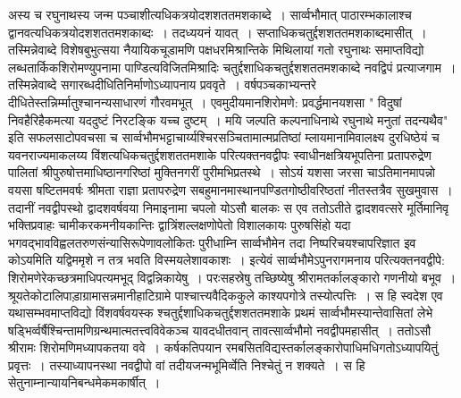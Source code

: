 \documentclass[10pt, openany]{book}
\begin{document}
अस्य च रघुनाथस्य जन्म पञ्चाशीत्यधिकत्रयोदशशततमशकाब्दे~। सार्व्वभौमात् पाठारम्भकालाश्च द्वानवत्यधिकत्रयोदशशततमशकाब्दः~। तदध्ययनं यावत्~।
सप्ताधिकचतुर्द्दशशततमशकाब्दमासीत्~। तस्मिन्नेवाब्दे विशेषबुभुत्सया नैयायिकचूडामणि पक्षधरमिश्रान्तिके मिथिलायां गतो रघुनाथः समाप्तविद्यो लब्धतार्किकशिरोमण्युपनामा पाण्डित्यविजितमिश्रादिः चतुर्द्दशाधिकचतुर्द्दशशततमशकाब्दे नवद्विपं प्रत्याजगाम~। तस्मिन्नेवाब्दे सगारब्धदीधितिनिर्माणोऽध्यापनाय
प्रववृते~। वर्षपञ्चकाभ्यन्तरे दीधितेस्तन्निर्म्मातुश्चानन्यसाधारणं गौरवमभूत्~। एवमुदीयमानशिरोमणे: प्रवर्द्धमानयशसा " विदुषां निवहैरिहैकमत्या यददुष्टं निरटङ्कि यच्च दुष्टम्~। मयि जल्पति कल्पनाधिनाथे रघुनाथे मनुतां तदन्यथैव" इति सफलसाटोपवचसा च सार्व्वभौमभट्टाचार्य्यश्चिरसञ्चितामात्मप्रतिष्ठां म्लायमानामिवालक्ष्य दुरधिष्ठेयं च यवनराज्यमाकलय्य विंशत्यधिकचतुर्द्दशशततमशाके परित्यक्तनवद्वीपः स्वाधीनक्षत्रियभूपतिना प्रतापरुद्रेण पालितां श्रीपुरुषोत्तमाधिष्ठानगरिष्ठां मुक्तिनगरीं पुरीमभिप्रतस्थे~। सोऽयं यशसा जरसा चाऽतिमानमापन्नो वयसा षष्टितमवर्षः श्रीमता राज्ञा प्रतापरुद्रेण सबहुमानमास्थानपण्डितगोष्ठीवरिष्ठतां नीतस्तत्रैव सुखमुवास~। तदानीं नवद्वीपस्थो द्वादशवर्षवया निमाइनामा चपलो योऽसौ बालकः स एव ततोऽतीते द्वादशवत्सरे मूर्तिमानिवृ  भक्तिप्रवाहः चामीकरकमनीयकान्तिः द्वात्रिंशल्लक्षणोपेतो विशालकायः पुरुषसिंहो यदा भगवद्भावविह्वलतरुणसंन्यासिरूपेणावलोकितः पुरीधाम्नि सार्व्वभौमेन तदा निष्परिचयश्चापरिज्ञात इव कोऽयमिति यद्विममृशे न तत्र भवति विस्मयलेशावकाशः~। इत्येवं सार्व्वभौमेऽपुनरागमनाय परित्यक्तनवद्वीपे: शिरोमणेरेकच्छत्रमाधिपत्यमभूद् विद्वन्निकायेषु~। परःसहस्रेषु तच्छिष्येषु श्रीरामतर्कालङ्कारो गणनीयो
बभूव~। श्रूयतेकोटालिपाड़ाग्रामासन्नमानीहाटिग्रामे पाश्चात्त्यवैदिककुले काश्यपगोत्रे तस्योत्पत्तिः~। स हि स्वदेश एव यथासम्भवमाप्तविद्यो विंशवर्षवयस्क
श्चतुर्द्दशाधिकचतुर्द्दशशततमशाके प्रथमं सार्व्वभौमस्यान्तेवासितां लेभे षड्भिर्व्वर्षैश्चिन्तामणिग्रन्थमात्मतत्त्वविवेकञ्च यावदधीतवान् तावत्सार्व्वभौमो नवद्वीपमहासीत्~। ततोऽसौ
श्रीरामः शिरोमणिमध्यापकतया ववे~। कर्षकतिपयान रमबसितविद्यस्तर्कालङ्कारोपाधिमधिगतोऽध्यापयितुं प्रवृत्तः~। तस्याध्यापनस्था नवद्वीपो वां तदीयजन्मभूमिर्व्वेति निश्चेतुं  न शक्यते~। स हि सेतुनाम्नान्यायनिबन्धमेकमकार्षीत्~।
\newpage
\noindent
\end{document}
